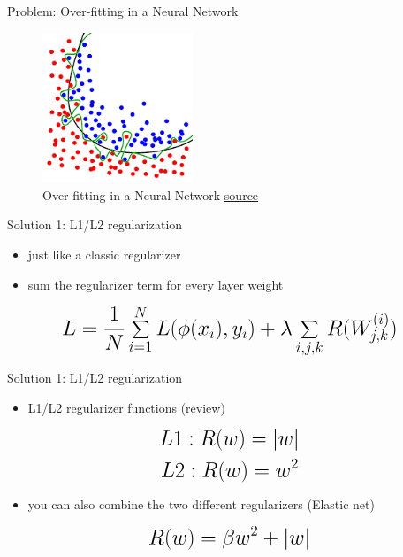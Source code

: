 \begin{frame}{Problem: Over-fitting in a Neural Network}
    \begin{figure}[H]
        \centering
        \includegraphics[width=0.4\textwidth]{Figs/section_4/overfitting.png}
        \caption{Over-fitting in a Neural Network \href{https://en.wikipedia.org/wiki/Overfitting}{source}}
    \end{figure}
\end{frame}

\begin{frame}{Solution 1: L1/L2 regularization}
    \begin{itemize}
        \item just like a classic regularizer
        \item sum the regularizer term for every layer weight
    \end{itemize}
    \vspace{0.2\textheight}
    \begin{equation*}
        \mathlarger{\mathlarger{\mathlarger{
        L = \frac{1}{N} \sum_{i=1}^{N} L(\phi(x_i), y_i) + \lambda \sum_{i,j,k} R(W_{j,k}^{(i)})
        }}}
    \end{equation*}
\end{frame}
\begin{frame}{Solution 1: L1/L2 regularization}
    \begin{itemize}
        \item L1/L2 regularizer functions (review)
    \end{itemize}
    \vspace{0.1\textheight}
    \begin{equation*}
        \mathlarger{\mathlarger{\mathlarger{
            L1: R(w) = \vert w\vert
        }}}
    \end{equation*}
    \begin{equation*}
        \mathlarger{\mathlarger{\mathlarger{
            L2: R(w) = w^2
        }}}
    \end{equation*}
    \begin{itemize}
        \item you can also combine the two different regularizers (Elastic net)
    \end{itemize}
    \vspace{0.1\textheight}
    \begin{equation*}
        \mathlarger{\mathlarger{\mathlarger{
        R(w) = \beta w^2 + \vert w\vert
        }}}
    \end{equation*}
\end{frame}


